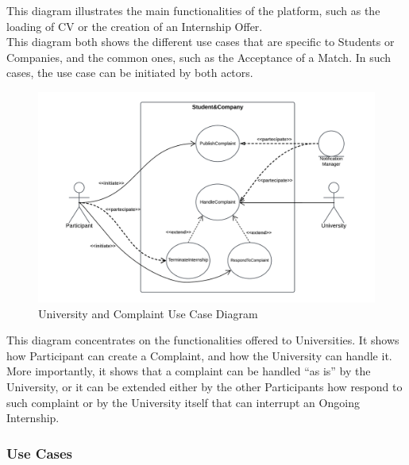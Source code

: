 This diagram illustrates the main functionalities of the platform, such as the loading of CV or the creation of an Internship Offer. \\
This diagram both shows the different use cases that are specific to Students or Companies, and the common ones, such as the Acceptance of a Match. In such cases, the use case can be initiated by both actors.
\clearpage
\begin{figure}[H]
    \centering
    \includegraphics[width=1 \textwidth]{Diagrams/UseDiagrams/UniversityUseCaseDiagram.png}
    \caption{University and Complaint Use Case Diagram}
    \label{fig:UniveristyUseCaseDiagram}
\end{figure}
This diagram concentrates on the functionalities offered to Universities. It shows how Participant can create a Complaint, and how the University can handle it. \\
More importantly, it shows that a complaint can be handled “as is” by the University, or it can be extended either by the other Participants how respond to such complaint or by the University itself that can interrupt an Ongoing Internship.
\clearpage

\subsubsection{Use Cases}

